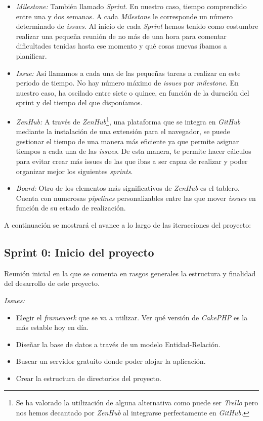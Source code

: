 \begin{itemize}
	\item \textit{Milestone:} También llamado \textit{Sprint}. En nuestro caso, tiempo comprendido entre una y dos semanas. A cada \textit{Milestone} le corresponde un número determinado de \textit{issues}. Al inicio de cada \textit{Sprint} hemos tenido como costumbre realizar una pequeña reunión de no más de una hora para comentar dificultades tenidas hasta ese momento y qué cosas nuevas íbamos a planificar.
	
	\item \textit{Issue:} Así llamamos a cada una de las pequeñas tareas a realizar en este periodo de tiempo. No hay número máximo de \textit{issues} por \textit{milestone}. En nuestro caso, ha oscilado entre siete o quince, en función de la duración del sprint y del tiempo del que disponíamos.
	
	\item \textit{ZenHub:} A través de \textit{ZenHub}\footnote{Se ha valorado la utilización de alguna alternativa como puede ser \textit{Trello} pero nos hemos decantado por \textit{ZenHub} al integrarse perfectamente en \textit{GitHub.}}, una plataforma que se integra en \textit{GitHub} mediante la instalación de una extensión para el navegador, se puede gestionar el tiempo de una manera más eficiente ya que permite asignar tiempos a cada una de las \textit{issues}. De esta manera, te permite hacer cálculos para evitar crear más issues de las que ibas a ser capaz de realizar y poder organizar mejor los siguientes \textit{sprints}.
	
	\item \textit{Board:} Otro de los elementos más significativos de \textit{ZenHub} es el tablero. Cuenta con numerosas \textit{pipelines} personalizables entre las que mover \textit{issues} en función de su estado de realización. 
\end{itemize}

A continuación se mostrará el avance a lo largo de las iteracciones del proyecto:

\subsection{Sprint 0: Inicio del proyecto}

Reunión inicial en la que se comenta en rasgos generales la estructura y finalidad del desarrollo de este proyecto. 

\textit{Issues:}
\begin{itemize}
	\item Elegir el \textit{framework} que se va a utilizar. Ver qué versión de \textit{CakePHP} es la más estable hoy en día.
	\item Diseñar la base de datos a través de un modelo Entidad-Relación. 
	\item Buscar un servidor gratuito donde poder alojar la aplicación.
	\item Crear la estructura de directorios del proyecto.
\end{itemize}

